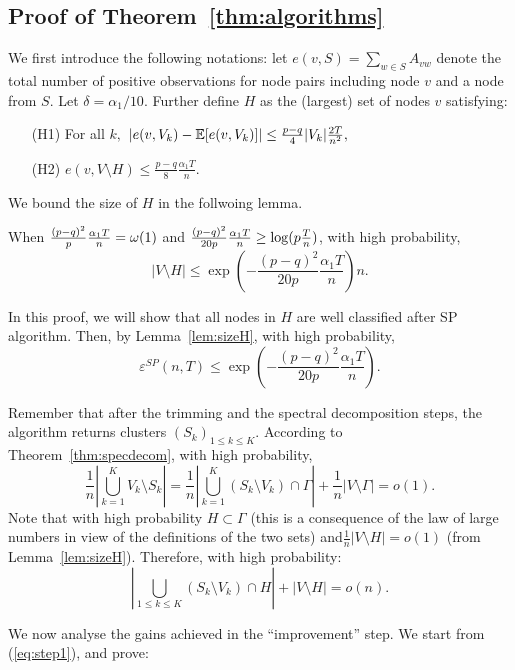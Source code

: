 \subsection{Proof of Theorem~\ref{thm:algorithms}}

We first introduce the following notations: let
$e(v,S) = \sum_{w \in S} A_{vw}$ denote the total number of positive
observations for node pairs including node $v$ and a node from
$S$. Let $\delta=\alpha_1/10$. Further define $H$ as the (largest) set
of nodes $v$ satisfying:
\begin{itemize}
\item[(H1)] For all $k,$ $|e(v,V_k) -{\mathbb E}
  [e(v,V_k)] | \le
  \frac{p-q}{4} |V_k| \frac{2T}{n^2},$

\item[(H2)] $e(v,V\setminus H) \le
  \frac{p-q}{8}\frac{\alpha_1 T}{n}.$
\end{itemize}
We bound the size of $H$ in the follwoing lemma.
\begin{lemma}
When $\frac{(p-q)^2}{p}{\alpha_1 T\over n} =\omega(1)$ and
$\frac{(p-q)^2}{20p}{\alpha_1 T\over n} \ge \log(p{T\over n})$, with
high probability, 
$$|V \setminus H| \le \exp\left( -    \frac{(p-q)^2}{20p}\frac{\alpha_1 T}{n} \right)n .$$
\label{lem:sizeH}
\end{lemma}

In this proof, we will show that all nodes in $H$ are well classified
after SP algorithm. Then, by Lemma~\ref{lem:sizeH}, with high
probability, 
$$\varepsilon^{SP} (n,T) \le \exp\left( -  \frac{(p-q)^2}{20p}\frac{\alpha_1 T}{n} \right).$$

 Remember that after the trimming and the spectral
decomposition steps, the algorithm returns clusters $(S_k)_{1\le k
  \le K}$. According to Theorem~\ref{thm:specdecom}, with high probability, 
$$\frac{1}{n}|\bigcup_{k=1}^K V_k \setminus S_k| =
\frac{1}{n}|\bigcup_{k=1}^K (S_k \setminus V_k) \cap \Gamma| +
\frac{1}{n}|V\setminus \Gamma| =o(1). $$
Note that with high probability $H\subset \Gamma$ (this is a consequence of the law of large numbers in
view of the definitions of the two sets) and$\frac{1}{n}|V\setminus
H| = o(1)$ (from Lemma~\ref{lem:sizeH}).
Therefore, with high probability:
\begin{equation}\label{eq:step1}
|\bigcup_{1\le k \le K}(S_k\setminus V_k)\cap H | + |V \setminus
H | =o(n).
\end{equation}


 We now analyse the gains achieved in the ``improvement'' step. We start from (\ref{eq:step1}), and prove:

